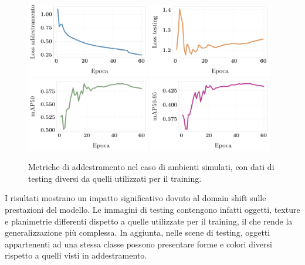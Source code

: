 \documentclass[12pt]{report}
\begin{document}
\begin{figure}[h!]
	\centering
	{\includegraphics[width=0.48\textwidth]{images/domain-shift/sim-to-sim/2/train-loss}}
	\hspace{0.01\textwidth}
	{\includegraphics[width=0.48\textwidth]{images/domain-shift/sim-to-sim/2/testing-loss}}
	\hspace{0.01\textwidth}
	\\
	{\includegraphics[width=0.48\textwidth]{images/domain-shift/sim-to-sim/2/map50}}
	\hspace{0.01\textwidth}
	{\includegraphics[width=0.48\textwidth]{images/domain-shift/sim-to-sim/2/map50-95}}
	\caption{Metriche di addestramento nel caso di ambienti simulati, con dati di testing diversi da quelli utilizzati per il training.}
	\label{fig:training-2}
\end{figure}

I risultati mostrano un impatto significativo dovuto al domain shift sulle prestazioni del modello. Le immagini di testing contengono infatti oggetti, texture e planimetrie differenti dispetto a quelle utilizzate per il training, il che rende la generalizzazione più complessa. In aggiunta, nelle scene di testing, oggetti appartenenti ad una stessa classe possono presentare forme e colori diversi rispetto a quelli visti in addestramento.
\end{document}
